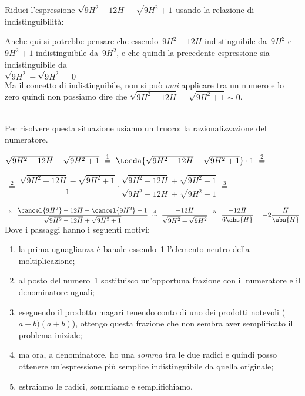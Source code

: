 \pagebreak %

\begin{esempio}
Riduci l'espressione 
\(\sqrt{9H^2 -12H} - \sqrt{9H^2 +1}\)
usando la relazione di indistinguibilità: 

\begin{osservazione}
 Anche qui si potrebbe pensare che essendo~\(9H^2 -12H\) indistinguibile 
da~\(9H^2\) e~\(9H^2 +1\) indistinguibile da~\(9H^2\), e che quindi la 
precedente espressione sia indistinguibile da \\
\(\sqrt{9H^2} - \sqrt{9H^2} = 0\)\\
Ma il concetto di indistinguibile, non si può \emph{mai} 
applicare tra un numero e lo zero quindi non possiamo dire che 
\(\sqrt{9H^2 -12H} - \sqrt{9H^2 +1} \sim 0\).
\end{osservazione}\\[1em]
Per risolvere questa situazione usiamo un trucco: la razionalizzazione del 
numeratore.

\(\sqrt{9H^2 -12H} - \sqrt{9H^2 +1}
~ \stackrel{1}{=} ~
   \tonda{\sqrt{9H^2 -12H} - \sqrt{9H^2 +1}} \cdot 1 
~ \stackrel{2}{=} ~\)

\(~ \stackrel{2}{=} ~\dfrac{\sqrt{9H^2 -12H}-\sqrt{9H^2 +1}}{1} \cdot 
   \dfrac{\sqrt{9H^2 -12H}+\sqrt{9H^2 +1}}{\sqrt{9H^2 -12H}+\sqrt{9H^2+1}}
~ \stackrel{3}{=} ~\)

\(~ \stackrel{3}{=} ~
   \dfrac{\cancel{9H^2} -12H - \cancel{9H^2} -1}
         {\sqrt{9H^2 -12H}+\sqrt{9H^2+1}}
~ \stackrel{4}{\sim} ~
   \dfrac{-12H}{\sqrt{9H^2} + \sqrt{9H^2}}
~ \stackrel{5}{=} ~
   \dfrac{-12H}{6\abs{H}} = -2\dfrac{H}{\abs{H}}\)\\

Dove i passaggi hanno i seguenti motivi:
\begin{enumerate} [nosep]
 \item la prima uguaglianza è banale essendo~1 l'elemento 
neutro della moltiplicazione; 
 \item al posto del numero~1 sostituisco un'opportuna frazione con 
il numeratore e il denominatore uguali; 
 \item eseguendo il prodotto magari tenendo conto di uno 
dei prodotti notevoli (\(a-b)(a+b)\)), ottengo questa frazione che
non sembra aver semplificato il problema iniziale;
 \item ma ora, a denominatore, ho una \emph{somma} tra le due radici 
e quindi posso ottenere un'espressione più semplice 
indistinguibile da quella originale;
 \item estraiamo le radici, sommiamo e semplifichiamo.
\end{enumerate}
\end{esempio}

